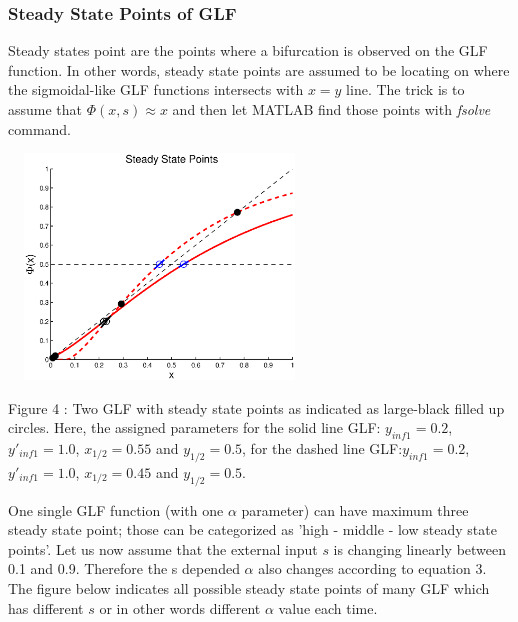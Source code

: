 \documentclass[twocolumn]{article}
\begin{document}
\subsubsection{Steady State Points of GLF}
Steady states point are the points where a bifurcation is observed on the GLF function. In other words, steady state points are assumed to be locating on where the sigmoidal-like GLF functions intersects with $x=y$ line. The trick is to assume that $\Phi(x,s) \approx x$ and then let MATLAB find those points with \textit{fsolve} command.
 
\begin{center}
\includegraphics[width=80mm,height=60mm]{steady_state.eps} 
   \begin{footnotesize} Figure 4 : Two GLF with steady state points as indicated as large-black filled up circles. Here, the assigned parameters for the solid line GLF: $y_{inf1}=0.2$, $y'_{inf1}=1.0$, $x_{1/2}=0.55$ and $y_{1/2}=0.5$, for the dashed line GLF:$y_{inf1}=0.2$, $y'_{inf1}=1.0$, $x_{1/2}=0.45$ and $y_{1/2}=0.5$.  \end{footnotesize}
\end{center}

 One single GLF function (with one $\alpha$ parameter) can have maximum three steady state point; those can be categorized as 'high - middle - low steady state points'. Let us now assume that the external input $s$ is changing linearly between 0.1 and 0.9. Therefore the s depended $\alpha$ also changes according to equation 3. The figure below indicates all possible steady state points of many GLF which has different $s$ or in other words different $\alpha$ value each time. 
\end{document}
